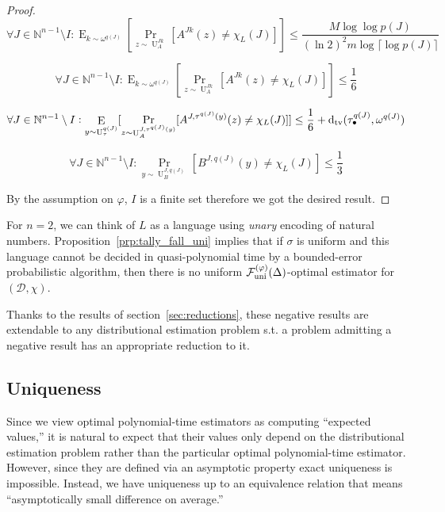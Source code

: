 \documentclass{article}
\numberwithin{equation}{section}
\theoremstyle{definition}
\theoremstyle{plain}
\DeclareMathOperator{\Prb}{Pr}
\DeclareMathOperator{\E}{E}
\DeclareMathOperator{\Un}{U}
\newcommand{\Dtv}{\operatorname{d}_{\textnormal{tv}}}
\newcommand{\Nats}{\mathbb{N}}
\newcommand{\Ceil}[1]{\lceil #1 \rceil}
\newcommand{\Dist}{\mathcal{D}}
\newcommand{\Fall}{\mathcal{F}}
\newcommand{\FallUt}[1]{{\Fall_{\textnormal{uni}}^{(#1)}}}
\begin{document}
\begin{proof}
\[\forall J \in \Nats^{n-1} \setminus I: \E_{k \sim \omega^{q(J)}}[\Prb_{z \sim \Un_A^{Jk}}[A^{Jk}(z) \neq \chi_L(J)]] \leq \frac{M \log \log p(J)}{(\ln 2)^2 m \log \Ceil{\log p(J)}}\]

\[\forall J \in \Nats^{n-1} \setminus I: \E_{k \sim \omega^{q(J)}}[\Prb_{z \sim \Un_A^{Jk}}[A^{Jk}(z) \neq \chi_L(J)]] \leq \frac{1}{6}\]

\[\forall J \in \Nats^{n-1} \setminus I: \E_{y \sim \Un_\tau^{q(J)}}[\Prb_{z \sim \Un_A^{J,\tau^{q(J)}(y)}}[A^{J,\tau^{q(J)}(y)}(z) \neq \chi_L(J)]] \leq \frac{1}{6}+\Dtv(\tau_\bullet^{q(J)},\omega^{q(J)})\]

\[\forall J \in \Nats^{n-1} \setminus I: \Prb_{y \sim \Un_B^{J,q(J)}}[B^{J,q(J)}(y) \ne \chi_L(J)] \leq \frac{1}{3}\]

By the assumption on ${\varphi}$, ${I}$ is a finite set therefore we got the desired result.
%
\end{proof}

For ${n=2}$, we can think of ${L}$ as a language using \emph{unary} encoding of natural numbers. Proposition~\ref{prp:tally_fall_uni}  implies that if ${\sigma}$ is uniform and this language cannot be decided in quasi-polynomial time by a bounded-error probabilistic algorithm, then there is no uniform ${\FallUt{\varphi}(\Delta)}$-optimal estimator for ${(\Dist,\chi)}$.

Thanks to the results of section~\ref{sec:reductions}, these negative results are extendable to any distributional estimation problem s.t. a problem admitting a negative result has an appropriate reduction to it.

\subsection{Uniqueness}

Since we view optimal polynomial-time estimators as computing \enquote{expected values,} it is natural to expect that their values only depend on the distributional estimation problem rather than the particular optimal polynomial-time estimator. However, since they are defined via an asymptotic property exact uniqueness is impossible. Instead, we have uniqueness up to an equivalence relation that means \enquote{asymptotically small difference on average.}
\end{document}
